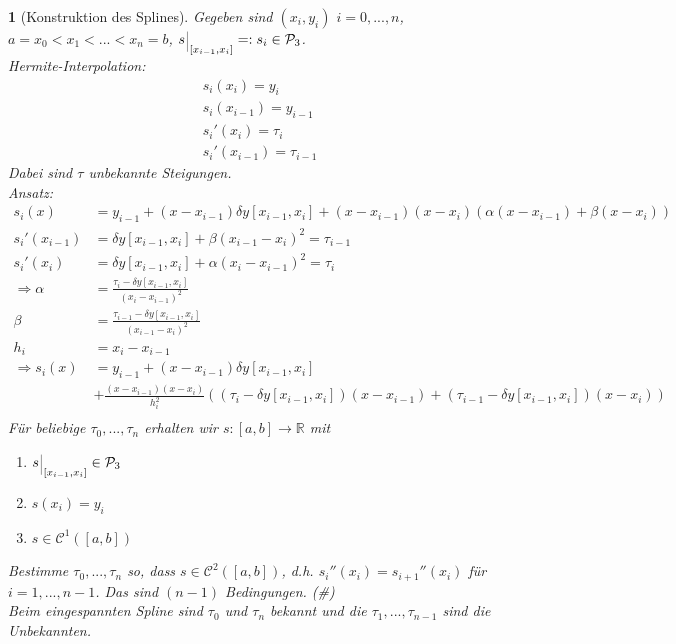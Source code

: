\documentclass[12pt]{article}
\theoremstyle{break}
\newtheorem{nothing}[theorem]{}
\begin{document}
\begin{nothing}[Konstruktion des Splines]
Gegeben sind $(x_i, y_i)$ $i=0,...,n$, $a = x_0 < x_1 < ... < x_n = b$, $s\,\rule[-2mm]{0.1mm}{5mm}_{\thinspace [x_{i-1}, x_i]} =: s_i \in \mathcal{P}_3$. \\
Hermite-Interpolation:
\begin{align*}
&s_i(x_i) = y_i &\\
&s_i(x_{i-1}) = y_{i-1} &\\
&s_i'(x_i) = \tau_i &\\
&s_i'(x_{i-1}) = \tau_{i-1}
\end{align*}
Dabei sind $\tau$ unbekannte Steigungen. \\
Ansatz: 
\begin{align*}
s_i(x) &= y_{i-1} + (x-x_{i-1}) \delta y[x_{i-1}, x_i] + (x-x_{i-1})(x-x_i) \left( \alpha (x-x_{i-1}) + \beta (x-x_i) \right) &\\
s_i'(x_{i-1}) &= \delta y[x_{i-1}, x_i] + \beta (x_{i-1} - x_i)^2 = \tau_{i-1} &\\
s_i'(x_i) &= \delta y[x_{i-1}, x_i] + \alpha (x_i - x_{i-1})^2 = \tau_i &\\
\Rightarrow \alpha &= \frac{\tau_i - \delta y[x_{i-1}, x_i]}{(x_i - x_{i-1})^2} &\\
\beta &= \frac{\tau_{i-1} - \delta y[x_{i-1}, x_i]}{(x_{i-1}- x_i)^2} &\\
h_i &= x_i-x_{i-1} &\\
\Rightarrow s_i(x) &= y_{i-1} + (x-x_{i-1}) \delta y [x_{i-1}, x_i] &\\ 
&+ \frac{(x-x_{i-1} )(x-x_i)}{h_i^2} \left( (\tau_i - \delta y[x_{i-1},x_i])(x-x_{i-1})+(\tau_{i-1} - \delta y[x_{i-1},x_i])(x-x_i) \right) &\\
\end{align*}
Für beliebige $\tau_0,..., \tau_n$ erhalten wir $s: [a,b] \rightarrow \mathbb{R}$ mit 
\begin{enumerate}
  \item[i)] $s\,\rule[-2mm]{0.1mm}{5mm}_{\thinspace [x_{i-1}, x_i]} \in \mathcal{P}_3$
  \item[ii)] $s(x_i) = y_i$
  \item[iii)] $s \in \mathcal{C}^1([a,b])$
\end{enumerate} 
Bestimme $\tau_0,..., \tau_n$ so, dass $s \in \mathcal{C}^2([a,b])$, d.h. $s_i''(x_i) = s_{i+1}''(x_i)$ für $i=1,...,n-1$. Das sind $(n-1)$ Bedingungen. (\#) \\
Beim eingespannten Spline sind $\tau_0$ und $\tau_n$ bekannt und die $\tau_1, ..., \tau_{n-1}$ sind die Unbekannten. \\

\end{nothing}
\end{document}
